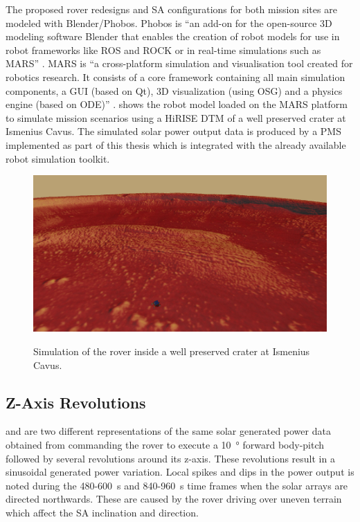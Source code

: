 The proposed rover redesigns and \ac{SA} configurations for both mission sites are modeled with Blender/Phobos. Phobos is ``an add-on for the open-source 3D modeling software Blender that enables the creation of robot models for use in robot frameworks like ROS and ROCK or in real-time simulations such as MARS'' . MARS is ``a cross-platform simulation and visualisation tool created for robotics research. It consists of a core framework containing all main simulation components, a GUI (based on Qt), 3D visualization (using OSG) and a physics engine (based on ODE)'' .  shows the robot model loaded on the MARS platform to simulate mission scenarios using a \ac{HiRISE} \ac{DTM} of a well preserved crater at Ismenius Cavus.  The simulated solar power output data is produced by a \ac{PMS} implemented as part of this thesis which is integrated with the already available robot simulation toolkit.

\begin{figure}[h]
  \captionsetup[subfigure]{justification=centering}
  \centering
  \hypersetup{linkcolor=captionTextColor}
  \includegraphics[width=0.70\linewidth]{sections/design/simulation/images/mars-sim-ismenius-cavus.png}\\
  \caption[Simulation of the rover inside a well preserved crater at Ismenius Cavus]
          {Simulation of the rover inside a well preserved crater at Ismenius Cavus.}
  \label{fig:simulated-mission-site-ismenius-cavus}
\end{figure}

\subsection{Z-Axis Revolutions}

 and  are two different representations of the same solar generated power data obtained from commanding the rover to execute a \SI{10}{\degree} forward body-pitch followed by several revolutions around its z-axis. These revolutions result in a sinusoidal generated power variation. Local spikes and dips in the power output is noted during the 480-\SI{600}{\second} and 840-\SI{960}{\second} time frames when the solar arrays are directed northwards. These are caused by the rover driving over uneven terrain which affect the \ac{SA} inclination and direction.


